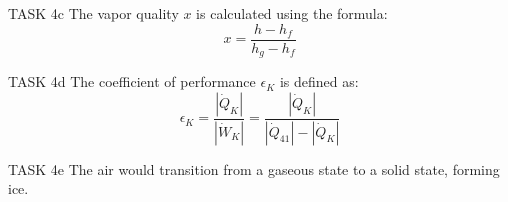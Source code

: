 TASK 4c  
The vapor quality \( x \) is calculated using the formula:  
\[
x = \frac{h - h_f}{h_g - h_f}
\]  

TASK 4d  
The coefficient of performance \( \epsilon_K \) is defined as:  
\[
\epsilon_K = \frac{|\dot{Q}_K|}{|\dot{W}_K|} = \frac{|\dot{Q}_K|}{|\dot{Q}_{41}| - |\dot{Q}_K|}
\]  

TASK 4e  
The air would transition from a gaseous state to a solid state, forming ice.